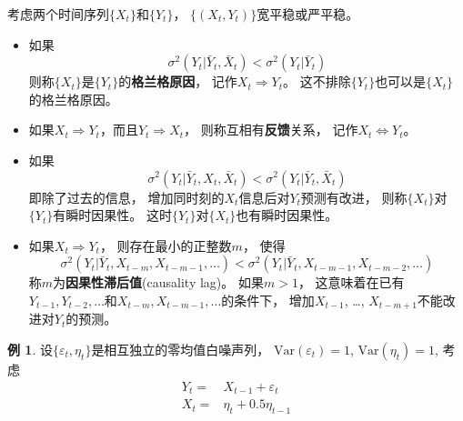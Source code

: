\documentclass[
]{article}
\providecommand{\tightlist}{%
  \setlength{\itemsep}{0pt}\setlength{\parskip}{0pt}}
\theoremstyle{definition}
\theoremstyle{definition}
\newtheorem{example}{例}[section]
\theoremstyle{definition}
\theoremstyle{definition}
\theoremstyle{remark}
\begin{document}
考虑两个时间序列\(\{ X_t \}\)和\(\{ Y_t \}\)，
\(\{(X_t, Y_t) \}\)宽平稳或严平稳。

\begin{itemize}
\tightlist
\item
  如果
  \[
  \sigma^2(Y_t | \bar Y_t, \bar X_t) < \sigma^2(Y_t | \bar Y_t)
  \]
  则称\(\{ X_t \}\)是\(\{ Y_t \}\)的\textbf{格兰格原因}，
  记作\(X_t \Rightarrow Y_t\)。
  这不排除\(\{ Y_t \}\)也可以是\(\{ X_t \}\)的格兰格原因。
\item
  如果\(X_t \Rightarrow Y_t\)，而且\(Y_t \Rightarrow X_t\)，
  则称互相有\textbf{反馈}关系，
  记作\(X_t \Leftrightarrow Y_t\)。
\item
  如果
  \[
  \sigma^2(Y_t | \bar Y_t, X_t, \bar X_t) < \sigma^2(Y_t | \bar Y_t, \bar X_t)
  \]
  即除了过去的信息，
  增加同时刻的\(X_t\)信息后对\(Y_t\)预测有改进，
  则称\(\{X_t \}\)对\(\{Y_t \}\)有瞬时因果性。
  这时\(\{Y_t \}\)对\(\{X_t \}\)也有瞬时因果性。
\item
  如果\(X_t \Rightarrow Y_t\)，
  则存在最小的正整数\(m\)，
  使得
  \[
  \sigma^2(Y_t | \bar Y_t, X_{t-m}, X_{t-m-1}, \dots) 
  < \sigma^2(Y_t | \bar Y_t, X_{t-m-1}, X_{t-m-2}, \dots) 
  \]
  称\(m\)为\textbf{因果性滞后值}(causality lag)。
  如果\(m>1\)，
  这意味着在已有\(Y_{t-1}, Y_{t-2}, \dots\)和\(X_{t-m}, X_{t-m-1}, \dots\)的条件下，
  增加\(X_{t-1}\), \dots, \(X_{t-m+1}\)不能改进对\(Y_t\)的预测。
\end{itemize}

\begin{example}
\protect\hypertarget{exm:causal-exaxylag1}{}\label{exm:causal-exaxylag1}设\(\{ \varepsilon_t, \eta_t \}\)是相互独立的零均值白噪声列，
\(\text{Var}(\varepsilon_t)=1\),
\(\text{Var}(\eta_t)=1\),
考虑
\[\begin{aligned}
Y_t =& X_{t-1} + \varepsilon_t \\
X_t =& \eta_t + 0.5 \eta_{t-1}
\end{aligned}\]
\end{example}
\end{document}
